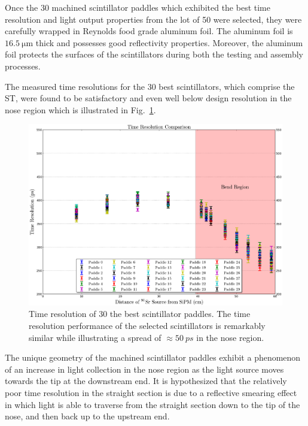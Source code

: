 Once the 30 machined scintillator paddles which exhibited the best time resolution and light output properties from the lot of 50 were selected, they were carefully wrapped in Reynolds food grade aluminum foil.  The aluminum foil is $\mathrm{16.5~\mu m}$ thick and possesses good reflectivity properties.  Moreover, the aluminum foil protects the surfaces of the scintillators during both the testing and assembly processes.
  
The measured time resolutions for the 30 best scintillators, which comprise the ST, were found to be satisfactory and even well below design resolution in the nose region which is illustrated in Fig.~\ref{fig:time_res_comp_final_30}.
	\begin{figure}[!htb]
		\centering
		\includegraphics[width=1.0\columnwidth]{fabrication/figs/time_res_comp_final_30}
		\caption{Time resolution of 30 the best scintillator paddles.  The time resolution performance of the selected scintillators is remarkably similar while illustrating a spread of $\approx 50\ ps$ in the nose region.}
		\label{fig:time_res_comp_final_30}
	\end{figure}

The unique geometry of the machined scintillator paddles exhibit a phenomenon of an increase in light collection in the nose region as the light source moves towards the tip at the downstream end.  It is hypothesized that the relatively poor time resolution in the straight section is due to a reflective smearing effect in which light is able to traverse from the straight section down to the tip of the nose, and then back up to the upstream end.

